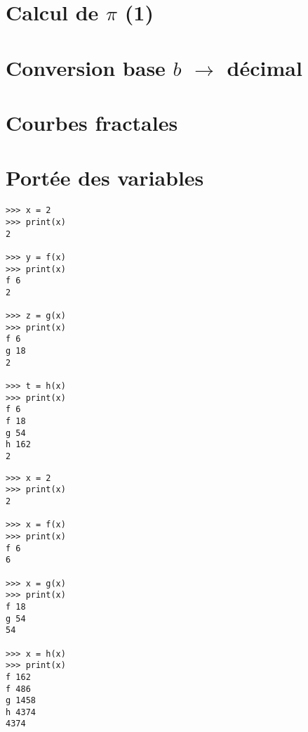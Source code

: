 \documentclass[11pt,a4paper]{article}
\begin{document}

\section{Calcul de $\pi$ (1)}


\section{Conversion base $b$ $\rightarrow$ décimal}



\section{Courbes fractales}
%

{}

\section{Portée des variables}
%

\begin{minipage}[t]{7cm}\footnotesize
\begin{verbatim}
>>> x = 2
>>> print(x)
2

>>> y = f(x)
>>> print(x)
f 6
2

>>> z = g(x)
>>> print(x)
f 6
g 18
2

>>> t = h(x)
>>> print(x)
f 6
f 18
g 54
h 162
2
\end{verbatim}
\end{minipage}
\hfill
\begin{minipage}[t]{7cm}\footnotesize
\begin{verbatim}
>>> x = 2
>>> print(x)
2

>>> x = f(x)
>>> print(x)
f 6
6

>>> x = g(x)
>>> print(x)
f 18
g 54
54

>>> x = h(x)
>>> print(x)
f 162
f 486
g 1458
h 4374
4374
\end{verbatim}
\end{minipage}
\end{document}
